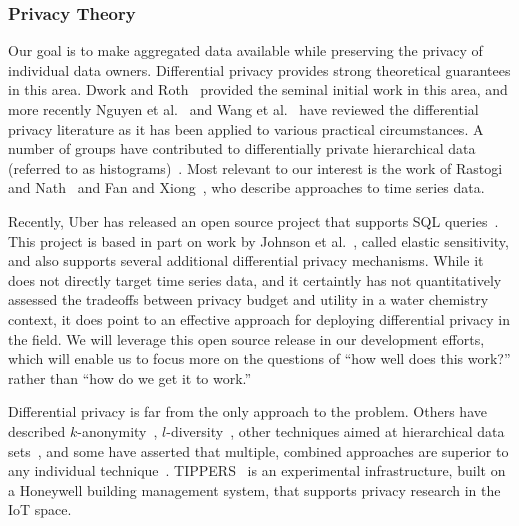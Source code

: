 \subsubsection{Privacy Theory}

Our goal is to make aggregated data available while preserving the
privacy of individual data owners.  Differential privacy
provides strong theoretical guarantees in this area.  Dwork and
Roth~\cite{dwork11,dr14} provided the seminal initial work in this
area, and more recently Nguyen et al.~\cite{nkk13} and
Wang et al.~\cite{wll15} have reviewed the differential
privacy literature as it has been applied to various practical circumstances.
A number of groups have contributed to differentially private hierarchical data
(referred to as histograms)~\cite{hrms10,xxy10}.
Most relevant to our interest is the work of
Rastogi and Nath~\cite{rn10} and
Fan and Xiong~\cite{fx12,fx14}, who describe approaches to time series data.

Recently, Uber has released an open source project that supports
SQL queries~\cite{uber2,Near18,uber}.  This project is based in part
on work by Johnson et al.~\cite{jns18}, called elastic sensitivity, and
also supports several additional differential privacy mechanisms.
While it does not directly target time series data,
and it certaintly has not quantitatively assessed the tradeoffs between
privacy budget and utility in a water chemistry context, it does
point to an effective approach for deploying differential privacy
in the field.  We will leverage this open source release in our
development efforts, which will enable us to focus more on the questions
of ``how well does this work?'' rather than ``how do we get it to work.''

Differential privacy is far from the only approach to the problem.
Others have described $k$-anonymity~\cite{samarati01,sweeney02},
$l$-diversity~\cite{mkgv07},
other techniques aimed at hierarchical data sets~\cite{lnpr14}, and some
have asserted that multiple, combined approaches are superior to any
individual technique~\cite{ct13}.
TIPPERS~\cite{tippers} is an experimental infrastructure, built on a
Honeywell building management system, that supports privacy research
in the IoT space.

